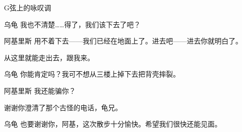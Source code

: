 \begin{dialog}{G弦上的咏叹调}
\begin{dialogue}
\item[乌龟]我也不清楚……得了，我们该下去了吧？

\item[阿基里斯]用不着下去——我们已经在地面上了。进去吧——进去你就明白了。


从这里就能走出去，跟我来。

\item[乌龟]你能肯定吗？我可不想从三楼上掉下去把背壳摔裂。

\item[阿基里斯]我还能骗你？


谢谢你澄清了那个古怪的电话，龟兄。

\item[乌龟]也要谢谢你，阿基，这次散步十分愉快。希望我们很快还能见面。

\end{dialogue}

\end{dialog}
